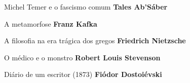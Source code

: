 \begin{multicols}{2}
\begin{enumerate}
{\item Michel Temer e o fascismo comum \textbf{Tales Ab'Sáber}
\item A metamorfose \textbf{Franz Kafka}
\item A filosofia na era trágica dos gregos \textbf{Friedrich Nietzsche}
\item O médico e o monstro \textbf{Robert Louis Stevenson}
\item Diário de um escritor (1873) \textbf{Fiódor Dostoiévski}
}
\end{enumerate}
\end{multicols}

\pagebreak
